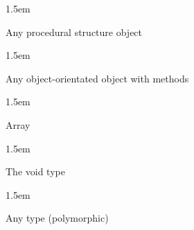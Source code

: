 \documentclass{article}
\begin{document}
\begin{mddefinitions}
\mddefterm{\noindent{\bfseries\{\}}}%

\begin{mdbmarginx}{}{}{}{1.5em}%
\begin{mddefdata}%

Any procedural structure object%
\end{mddefdata}%
\end{mdbmarginx}%


\begin{mdbmarginx}{}{}{}{1.5em}%
\begin{mddefdata}%

Any object-orientated object with methods%
\end{mddefdata}%
\end{mdbmarginx}%


\begin{mdbmarginx}{}{}{}{1.5em}%
\begin{mddefdata}%

Array%
\end{mddefdata}%
\end{mdbmarginx}%


\begin{mdbmarginx}{}{}{}{1.5em}%
\begin{mddefdata}%

The void type%
\end{mddefdata}%
\end{mdbmarginx}%

\mddefterm{\noindent{\bfseries*}}%

\begin{mdbmarginx}{}{}{}{1.5em}%
\begin{mddefdata}%

Any type (polymorphic)%
\end{mddefdata}%
\end{mdbmarginx}%
\end{mddefinitions}%
\end{document}
